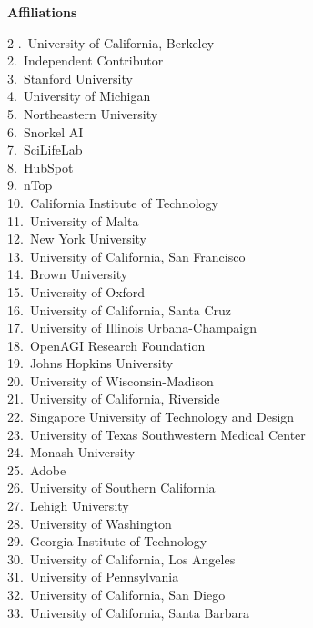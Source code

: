 \documentclass{llmxive}
\begin{document}
\medskip
\noindent\textbf{Affiliations}
\vspace{4pt}

{\footnotesize
\begin{multicols}{2}
.~University of California, Berkeley \\
2.~Independent Contributor \\
3.~Stanford University \\
4.~University of Michigan \\
5.~Northeastern University \\
6.~Snorkel AI \\
7.~SciLifeLab \\
8.~HubSpot \\
9.~nTop \\
10.~California Institute of Technology \\
11.~University of Malta \\
12.~New York University \\
13.~University of California, San Francisco \\
14.~Brown University \\
15.~University of Oxford \\
16.~University of California, Santa Cruz \\
17.~University of Illinois Urbana-Champaign \\
18.~OpenAGI Research Foundation \\
19.~Johns Hopkins University \\
20.~University of Wisconsin-Madison \\
21.~University of California, Riverside \\
22.~Singapore University of Technology and Design \\
23.~University of Texas Southwestern Medical Center \\
24.~Monash University \\
25.~Adobe \\
26.~University of Southern California \\
27.~Lehigh University \\
28.~University of Washington \\
29.~Georgia Institute of Technology \\
30.~University of California, Los Angeles \\
31.~University of Pennsylvania \\
32.~University of California, San Diego \\
33.~University of California, Santa Barbara \\

\end{multicols}}
\end{document}
